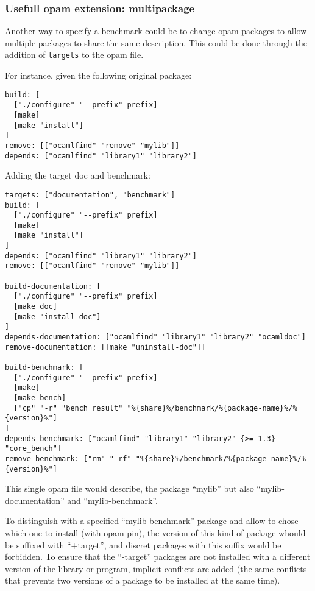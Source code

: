 \documentclass[11pt,a4paper]{article}
\begin{document}
\subsubsection{Usefull opam extension: multipackage}\label{opam-multipackage}

Another way to specify a benchmark could be to change opam packages to
allow multiple packages to share the same description. This could be
done through the addition of {\tt targets} to the opam file.

For instance, given the following original package:

\begin{verbatim}
build: [
  ["./configure" "--prefix" prefix]
  [make]
  [make "install"]
]
remove: [["ocamlfind" "remove" "mylib"]]
depends: ["ocamlfind" "library1" "library2"]
\end{verbatim}

Adding the target doc and benchmark:

\begin{verbatim}
targets: ["documentation", "benchmark"]
build: [
  ["./configure" "--prefix" prefix]
  [make]
  [make "install"]
]
depends: ["ocamlfind" "library1" "library2"]
remove: [["ocamlfind" "remove" "mylib"]]

build-documentation: [
  ["./configure" "--prefix" prefix]
  [make doc]
  [make "install-doc"]
]
depends-documentation: ["ocamlfind" "library1" "library2" "ocamldoc"]
remove-documentation: [[make "uninstall-doc"]]

build-benchmark: [
  ["./configure" "--prefix" prefix]
  [make]
  [make bench]
  ["cp" "-r" "bench_result" "%{share}%/benchmark/%{package-name}%/%{version}%"]
]
depends-benchmark: ["ocamlfind" "library1" "library2" {>= 1.3} "core_bench"]
remove-benchmark: ["rm" "-rf" "%{share}%/benchmark/%{package-name}%/%{version}%"]
\end{verbatim}

This single opam file would describe, the package ``mylib'' but also
``mylib-documentation'' and ``mylib-benchmark''.

To distinguish with a specified ``mylib-benchmark'' package and allow
to chose which one to install (with opam pin), the version of this
kind of package whould be suffixed with ``+target'', and discret
packages with this suffix would be forbidden. To ensure that the
``-target'' packages are not installed with a different version of the
library or program, implicit conflicts are added (the same conflicts
that prevents two versions of a package to be installed at the same
time).
\end{document}
